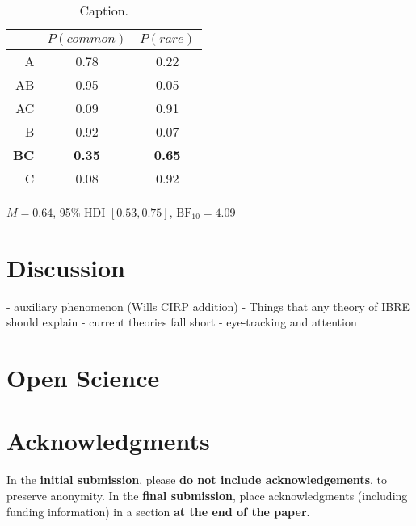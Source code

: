 \documentclass[10pt,letterpaper]{article}
\begin{document}
\begin{table}[H]
  \begin{center}
    \caption{Caption.\\}
    \label{tab:results-exp2}
    \vskip 0.12in
    \begin{tabular}{rcc}
      \hline
       & $P(common)$ & $P(rare)$ \\
      \hline
      A & 0.78 & 0.22  \\
      AB & 0.95 & 0.05 \\
      AC & 0.09 & 0.91 \\
      B & 0.92 & 0.07  \\
      \textbf{BC} & \textbf{0.35} & \textbf{0.65} \\
      C & 0.08 & 0.92 \\
    \end{tabular}
  \end{center}
\end{table}

$M = 0.64$, 95\% HDI $[0.53, 0.75]$, $\mathrm{BF}_{10} = 4.09$

\section{Discussion}

- auxiliary phenomenon (Wills CIRP addition)
- Things that any theory of IBRE should explain
- current theories fall short
- eye-tracking and attention

\section{Open Science}

\section{Acknowledgments}

In the \textbf{initial submission}, please \textbf{do not include
  acknowledgements}, to preserve anonymity.  In the \textbf{final submission},
place acknowledgments (including funding information) in a section \textbf{at
the end of the paper}.



\setlength{\bibleftmargin}{.125in}
\setlength{\bibindent}{-\bibleftmargin}


\end{document}
